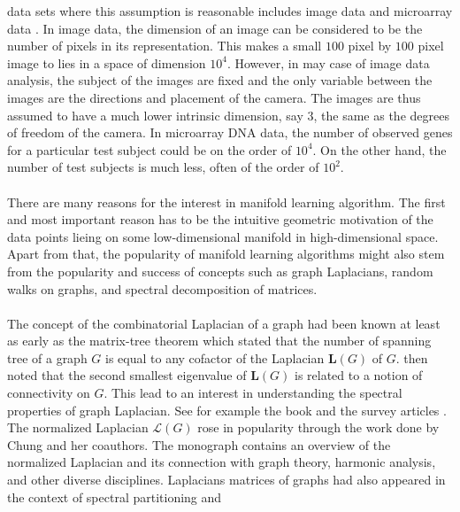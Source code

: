 data sets where this assumption is reasonable includes image data
\citep{tenebaum00:_global_geomet_framew_nonlin_dimen_reduc,bregler95:_nonlin,bregler94:_surfac}
and microarray data \citep{wouters03:_graph}. In image data, the
dimension of an image can be considered to be the number of pixels in
its representation. This makes a small $100$ pixel by $100$ pixel
image to lies in a space of dimension $10^4$. However, in may case of
image data analysis, the subject of the images are fixed and the only
variable between the images are the directions and placement of the
camera. The images are thus assumed to have a much lower intrinsic
dimension, say $3$, the same as the degrees of freedom of the
camera. In microarray DNA data, the number of observed genes for a
particular test subject could be on the order of $10^4$. On the other
hand, the number of test subjects is much less, often of the order of
$10^2$.
\\ \\
%
%
\noindent
There are many reasons for the interest in manifold learning
algorithm. The first and most important reason has to be the intuitive
geometric motivation of the data points lieing on some low-dimensional
manifold in high-dimensional space. Apart from that, the popularity of
manifold learning algorithms might also stem from the popularity and
success of concepts such as graph Laplacians, random
walks on graphs, and spectral decomposition of matrices.  \\ \\
%
\noindent The concept of the combinatorial Laplacian of a graph had
been known at least as early as the matrix-tree theorem
\citep{kirchhoff47:_uber_aufl_gleic_str} which stated that the number
of spanning tree of a graph $G$ is equal to any cofactor of the
Laplacian $\mathbf{L}(G)$ of $G$. \citet{fiedler73:_algeb} then noted
that the second smallest eigenvalue of $\mathbf{L}(G)$ is related to a
notion of connectivity on $G$. This lead to an interest in
understanding the spectral properties of graph Laplacian. See for
example the book \citet{cvetkovic80:_spect_graph_theor_applic} and the
survey articles \citet{merris94:_laplac,mohar91:_graph}. The
normalized Laplacian $\bm{\mathcal{L}}(G)$ rose in popularity through
the work done by Chung and her coauthors. The monograph
\citet{chung97:_spect_graph_theor} contains an overview of the
normalized Laplacian and its connection with graph theory, harmonic
analysis, and other diverse disciplines. Laplacians matrices of graphs
had also appeared in the context of spectral partitioning and
